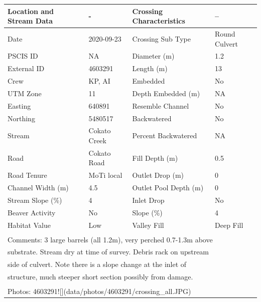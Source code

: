 \documentclass[
]{book}
\begin{document}
\begin{tabular}{l|l|l|l}
\hline
Location and Stream Data & - & Crossing Characteristics & --\\
\hline
Date & 2020-09-23 & Crossing Sub Type & Round Culvert\\
\hline
PSCIS ID & NA & Diameter (m) & 1.2\\
\hline
External ID & 4603291 & Length (m) & 13\\
\hline
Crew & KP, AI & Embedded & No\\
\hline
UTM Zone & 11 & Depth Embedded (m) & NA\\
\hline
Easting & 640891 & Resemble Channel & No\\
\hline
Northing & 5480517 & Backwatered & No\\
\hline
Stream & Cokato Creek & Percent Backwatered & NA\\
\hline
Road & Cokato Road & Fill Depth (m) & 0.5\\
\hline
Road Tenure & MoTi local & Outlet Drop (m) & 0\\
\hline
Channel Width (m) & 4.5 & Outlet Pool Depth (m) & 0\\
\hline
Stream Slope (\%) & 4 & Inlet Drop & No\\
\hline
Beaver Activity & No & Slope (\%) & 4\\
\hline
Habitat Value & Low & Valley Fill & Deep Fill\\
\hline
\multicolumn{4}{l}{\textsuperscript{} Comments: 3 large barrels (all 1.2m), very perched 0.7-1.3m above}\\
\multicolumn{4}{l}{substrate. Stream dry at time of survey. Debris rack on upstream}\\
\multicolumn{4}{l}{side of culvert. Note there is a slope change at the inlet of}\\
\multicolumn{4}{l}{structure, much steeper short section possibly from damage.}\\
\multicolumn{4}{l}{\textsuperscript{} Photos: 4603291![](data/photos/4603291/crossing\_all.JPG)}\\
\end{tabular}
\end{document}
